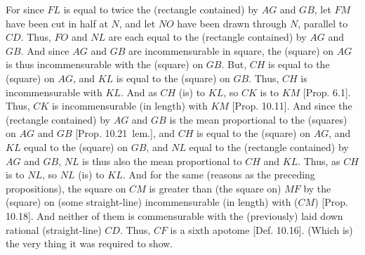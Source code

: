 \begin{Parallel}{}{}
{For since $FL$ is equal to twice the (rectangle contained) by $AG$
and $GB$, let $FM$ have been cut in half at $N$, and let $NO$
have been drawn through $N$, parallel to $CD$. Thus, $FO$ and $NL$
are each equal to the (rectangle contained) by $AG$ and $GB$. And since
$AG$ and $GB$ are incommensurable in square, the (square) on $AG$
is thus incommensurable with the (square) on $GB$. But, $CH$ is equal to
the (square) on $AG$, and $KL$ is equal to the (square) on $GB$. 
Thus, $CH$ is incommensurable with $KL$. And as $CH$ (is) to
$KL$, so $CK$ is to $KM$ [Prop. 6.1].  Thus,
$CK$ is incommensurable (in length) with $KM$ [Prop. 10.11]. And since the (rectangle contained)
by $AG$ and $GB$ is the mean proportional to the (squares) on 
$AG$ and $GB$ [Prop. 10.21~lem.], and $CH$ is equal to the (square) on $AG$, and $KL$ 
equal to the (square) on $GB$, and $NL$ equal to the (rectangle contained)
by $AG$ and $GB$, $NL$ is thus also the mean proportional to
$CH$ and $KL$. Thus, as $CH$ is to $NL$, so $NL$ (is) to $KL$.
And for the same (reasons as the preceding propositions), the square on 
$CM$ is greater than (the square on) $MF$ by the (square) on (some
straight-line) incommensurable (in length) with ($CM$) [Prop. 10.18]. And neither
of them is commensurable with the (previously) laid down rational 
(straight-line) $CD$. Thus, $CF$ is a sixth apotome 
[Def. 10.16]. (Which is) the very thing it was required to show.}
\end{Parallel}

